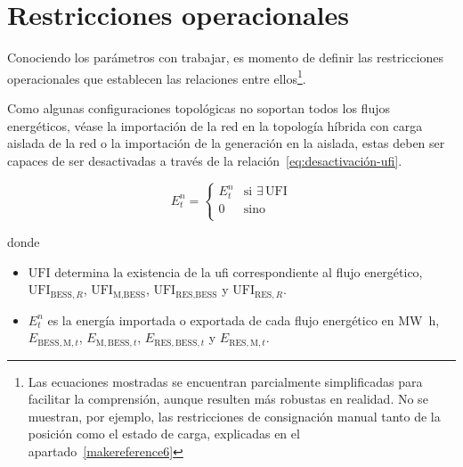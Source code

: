\section{Restricciones operacionales}%
\label{makereference5.2}

Conociendo los parámetros con trabajar, es momento de definir las restricciones operacionales que establecen las relaciones entre ellos\footnote{Las ecuaciones mostradas se encuentran parcialmente simplificadas para facilitar la comprensión, aunque resulten más robustas en realidad. No se muestran, por ejemplo, las restricciones de consignación manual tanto de la posición como el estado de carga, explicadas en el apartado~\ref{makereference6}}.

Como algunas configuraciones topológicas no soportan todos los flujos energéticos, véase la importación de la red en la topología híbrida con carga aislada de la red o la importación de la generación en la aislada, estas deben ser capaces de ser desactivadas a través de la relación~\ref{eq:desactivación-ufi}.

\begin{samepage}

  \begin{equation}%
    \label{eq:desactivación-ufi}
    E^{n}_{t} =
    \begin{cases}
      E^{n}_{t} & \text{si } \exists \, \text{UFI} \\
      0         & \text{sino}                      \\
    \end{cases}
  \end{equation}

  donde

  \begin{itemize}

    \item \( \text{UFI} \) determina la existencia de la \gls{ufi} correspondiente al flujo energético,  \( \text{UFI}_{\text{BESS}, R} \), \( \text{UFI}_{\text{M}, \text{BESS}} \), \( \text{UFI}_{\text{RES}, \text{BESS}} \) y \( \text{UFI}_{\text{RES}, R} \).

    \item \( E^{n}_{t} \) es la energía importada o exportada de cada flujo energético en \si{{\mega\watt\hour}}, \( E_{\text{BESS}, \text{M}, t} \), \( E_{\text{M}, \text{BESS}, t} \), \( E_{\text{RES}, \text{BESS}, t} \) y \( E_{\text{RES}, \text{M}, t} \).

  \end{itemize}

\end{samepage}

